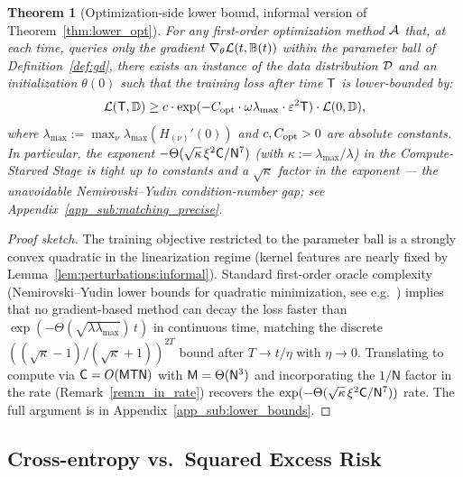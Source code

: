 \documentclass[11pt]{article}
\theoremstyle{plain}
\newtheorem{theorem}{Theorem}[section]
\begin{document}
\begin{theorem}[Optimization-side lower bound, informal version of Theorem~\ref{thm:lower_opt}]\label{thm:lower_opt:informal}
    For any first-order optimization method ${\cal A}$ that, at each time, queries only the gradient $\nabla_\theta {\cal L}(t,\mathbb{B}(t))$ within the parameter ball of Definition~\ref{def:gd}, there exists an instance of the data distribution ${\cal D}$ and an initialization $\theta(0)$ such that the training loss after time $\sf T$ is lower-bounded by:
    \begin{align*}
        {\cal L}({\sf T}, \mathbb{D}) \ge c\cdot\exp(-C_{\rm opt}\cdot \omega\lambda_{\max} \cdot \varepsilon^2 {\sf T}) \cdot {\cal L}(0, \mathbb{D}),
    \end{align*}
    where $\lambda_{\max}:= \max_\nu \lambda_{\max}(H_{(\nu)}'(0))$ and $c, C_{\rm opt}>0$ are absolute constants. In particular, the exponent $-\Theta(\sqrt{\kappa}\,\xi^2{\sf C}/{\sf N}^7)$ (with $\kappa:=\lambda_{\max}/\lambda$) in the {\it Compute-Starved Stage} is tight up to constants and a $\sqrt{\kappa}$ factor in the exponent --- the unavoidable Nemirovski--Yudin condition-number gap; see Appendix~\ref{app_sub:matching_precise}.
\end{theorem}

\begin{proof}[Proof sketch]
    The training objective restricted to the parameter ball is a strongly convex quadratic in the linearization regime (kernel features are nearly fixed by Lemma~\ref{lem:perturbations:informal}). Standard first-order oracle complexity (Nemirovski--Yudin lower bounds for quadratic minimization, see e.g.~\citealp{nes03}) implies that no gradient-based method can decay the loss faster than $\exp(-\Theta(\sqrt{\lambda\lambda_{\max}})\,t)$ in continuous time, matching the discrete $((\sqrt\kappa-1)/(\sqrt\kappa+1))^{2T}$ bound after $T\to t/\eta$ with $\eta\to 0$. Translating to compute via ${\sf C}=O({\sf MTN})$ with ${\sf M}=\Theta({\sf N}^3)$ and incorporating the $1/\mathsf{N}$ factor in the rate (Remark~\ref{rem:n_in_rate}) recovers the $\exp(-\Theta(\sqrt{\kappa}\,\xi^2{\sf C}/{\sf N}^7))$ rate. The full argument is in Appendix~\ref{app_sub:lower_bounds}.
\end{proof}

\subsection{Cross-entropy vs.\ Squared Excess Risk}\label{app_sub:ce_l2_bridge}
\end{document}
